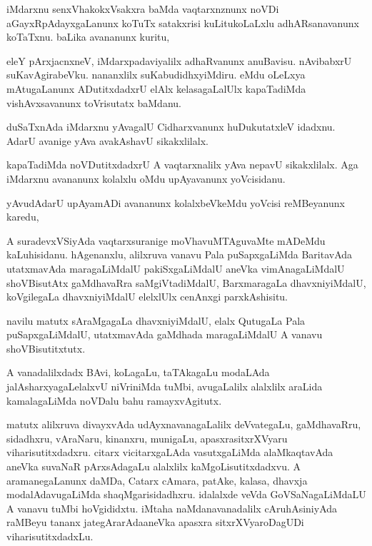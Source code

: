 \documentclass{article}
\begin{document}
\begin{mn}
iMdarxnu senxVhakokxVsakxra baMda vaqtarxnznunx noVDi aGayxRpAdayxgaLanunx 
koTuTx satakxrisi kuLitukoLaLxlu  adhARsanavanunx  koTaTxnu.  baLika avananunx kuritu,
\end{mn}

\begin{mn}
eleY pArxjacnxneV, iMdarxpadaviyalilx adhaRvanunx  anuBavisu. nAvibabxrU  
suKavAgirabeVku.  nananxlilx suKabudidhxyiMdiru.  eMdu oLeLxya mAtugaLanunx 
ADutitxdadxrU elAlx kelasagaLalUlx kapaTadiMda vishAvxsavanunx toVrisutatx baMdanu.
\end{mn}

\begin{mn}
duSaTxnAda iMdarxnu yAvagalU Cidharxvanunx huDukutatxleV idadxnu. AdarU 
avanige yAva avakAshavU sikakxlilalx.
\end{mn}

\begin{mn}
kapaTadiMda noVDutitxdadxrU A vaqtarxnalilx  yAva nepavU sikakxlilalx.  
Aga iMdarxnu avananunx kolalxlu oMdu upAyavanunx yoVcisidanu.
\end{mn}

\begin{mn}
yAvudAdarU upAyamADi avananunx kolalxbeVkeMdu yoVcisi reMBeyanunx karedu,
\end{mn}

\begin{mn}
A suradevxVSiyAda  vaqtarxsuranige moVhavuMTAguvaMte mADeMdu kaLuhisidanu.  
hAgenanxlu,  alilxruva vanavu Pala puSapxgaLiMda BaritavAda utatxmavAda  
maragaLiMdalU  pakiSxgaLiMdalU aneVka vimAnagaLiMdalU  shoVBisutAtx  
gaMdhavaRra  saMgiVtadiMdalU,  BarxmaragaLa  dhavxniyiMdalU, koVgilegaLa 
dhavxniyiMdalU elelxlUlx cenAnxgi parxkAshisitu.
\end{mn}

\begin{mn}
navilu matutx sAraMgagaLa  dhavxniyiMdalU, elalx QutugaLa Pala puSapxgaLiMdalU, 
utatxmavAda gaMdhada maragaLiMdalU A vanavu shoVBisutitxtutx.
\end{mn}

\begin{mn}
A vanadalilxdadx BAvi, koLagaLu, taTAkagaLu modaLAda jalAsharxyagaLelalxvU  
niVriniMda tuMbi, avugaLalilx alalxlilx araLida kamalagaLiMda noVDalu bahu ramayxvAgitutx. 
\end{mn}

\begin{mn}
matutx alilxruva divayxvAda udAyxnavanagaLalilx  deVvategaLu, gaMdhavaRru, 
sidadhxru, vAraNaru, kinanxru, munigaLu, apasxrasitxrXVyaru viharisutitxdadxru. 
citarx vicitarxgaLAda vasutxgaLiMda alaMkaqtavAda aneVka suvaNaR pArxsAdagaLu 
alalxlilx kaMgoLisutitxdadxvu.  A aramanegaLanunx  daMDa, Catarx cAmara, 
patAke, kalasa, dhavxja modalAdavugaLiMda shaqMgarisidadhxru.  idalalxde veVda 
GoVSaNagaLiMdaLU A vanavu tuMbi hoVgididxtu.  iMtaha naMdanavanadalilx  
cAruhAsiniyAda raMBeyu tananx jategArarAdaaneVka apasxra sitxrXVyaroDagUDi viharisutitxdadxLu.
\end{mn}
\end{document}
